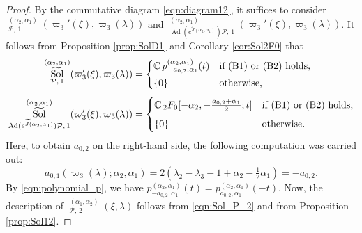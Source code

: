 \documentclass[a4paper,11pt,reqno]{amsart}
\newcommand{\CC}{\mathbb{C}}
\newcommand{\calP}{\mathcal{P}}
\newcommand{\0}{{\bf 0}}
\newcommand{\1}{{\bf 1}}
\DeclareMathOperator{\Ad}{Ad}
\DeclareMathOperator{\Sol}{Sol}
\newcommand{\wJ}{\widetilde{J}}
\DeclareMathOperator{\wSol}{\widetilde{\Sol}}
\theoremstyle{plain}
\theoremstyle{definition}
\numberwithin{equation}{section}
\theoremstyle{definition}
\begin{document}
\begin{proof}
By the commutative diagram \eqref{eqn:diagram12}, it suffices to consider
$\wSol_{\calP,\, 1}^{(\alpha_2, \alpha_1)}(\varpi_3'(\xi),\varpi_3(\lambda))$
and
$\wSol_{\Ad(e^{\wJ(\alpha_2,\alpha_1)}) \calP,\, 1}^{(\alpha_2, \alpha_1)}(\varpi_3'(\xi),\varpi_3(\lambda))$. It follows from Proposition \ref{prop:SolD1} 
and Corollary \ref{cor:Sol2F0} that 
\begin{align}
\wSol_{\calP,\, 1}^{(\alpha_2, \alpha_1)}(\varpi_3'(\xi),\varpi_3(\lambda))
&=
\begin{cases}
\CC\,
p_{-a_{0,2},\alpha_1}^{(\alpha_2,\alpha_1)}(t) & 
\textnormal{if (B1) or (B2) holds,}\\[3pt]
\{0\} & \textnormal{otherwise,}
\end{cases}\label{eqn:Sol_P_2}\\[3pt]
\wSol_{\Ad(e^{\wJ(\alpha_2,\alpha_1)}) \calP,\, 1}^{(\alpha_2, \alpha_1)}(\varpi_3'(\xi),\varpi_3(\lambda))
&=
\begin{cases}
\CC\, 
{}_2F_0[-\alpha_2,-\tfrac{a_{0,2}+\alpha_1}{2};t]
& 
\textnormal{if (B1) or (B2) holds,}\\[5pt]
\{0\} & \textnormal{otherwise.}
\end{cases}\label{eqn:Sol_AdP_2}
\end{align}
Here, to obtain $a_{0,2}$ on the right-hand side, 
the following computation was carried out:
\begin{equation*}
a_{0,1}(\varpi_3(\lambda);\alpha_2,\alpha_1)
=2(\lambda_2-\lambda_3-1+\alpha_2-\tfrac{1}{2}\alpha_1)
=-a_{0,2}.
\end{equation*}
By \eqref{eqn:polynomial_p}, we have 
$p_{-a_{0,2},\alpha_1}^{(\alpha_2,\alpha_1)}(t) =
p_{a_{0,2},\alpha_1}^{(\alpha_2,\alpha_1)}(-t)$.
Now, the description of $\wSol_{\calP,\, 2}^{(\alpha_1,\alpha_2)}(\xi,\lambda)$ follows from \eqref{eqn:Sol_P_2} and from Proposition \ref{prop:Sol12}.


\end{proof}
\end{document}

